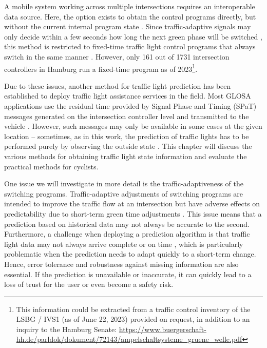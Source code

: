 A mobile system working across multiple intersections requires an interoperable data source. Here, the option exists to obtain the control programs directly, but without the current internal program state \cite{zweck_traffic_2013}. Since traffic-adaptive signals may only decide within a few seconds how long the next green phase will be switched \cite{islam_improved_2016}, this method is restricted to fixed-time traffic light control programs that always switch in the same manner \cite{zweck_traffic_2013}. However, only 161 out of 1731 intersection controllers in Hamburg run a fixed-time program as of 2023\footnote{This information could be extracted from a traffic control inventory of the LSBG / IVS1 (as of June 22, 2023) provided on request, in addition to an inquiry to the Hamburg Senate: \url{https://www.buergerschaft-hh.de/parldok/dokument/72143/ampelschaltsysteme_gruene_welle.pdf}}.

Due to these issues, another method for traffic light prediction has been established to deploy traffic light assistance services in the field. Most GLOSA applications use the residual time provided by Signal Phase and Timing (SPaT) messages generated on the intersection controller level and transmitted to the vehicle \cite{wagner_spatmap_2023}. However, such messages may only be available in some cases at the given location -- sometimes, as in this work, the prediction of traffic lights has to be performed purely by observing the outside state \cite{protschky_extensive_2014, protschky_adaptive_2014}. This chapter will discuss the various methods for obtaining traffic light state information and evaluate the practical methods for cyclists.

One issue we will investigate in more detail is the traffic-adaptiveness of the switching programs. Traffic-adaptive adjustments of switching programs are intended to improve the traffic flow at an intersection but have adverse effects on predictability due to short-term green time adjustments \cite{schweiger_elisatm_2011, bodenheimer_enabling_2014}. This issue means that a prediction based on historical data may not always be accurate to the second. Furthermore, a challenge when deploying a prediction algorithm is that traffic light data may not always arrive complete or on time \cite{protschky_extensive_2014, protschky_adaptive_2014}, which is particularly problematic when the prediction needs to adapt quickly to a short-term change. Hence, error tolerance and robustness against missing information are also essential. If the prediction is unavailable or inaccurate, it can quickly lead to a loss of trust for the user or even become a safety risk.

